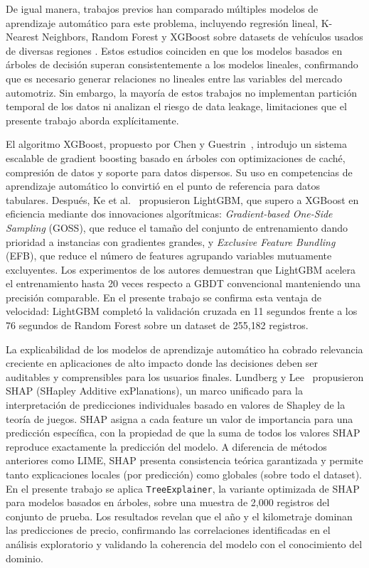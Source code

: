 \documentclass[conference]{IEEEtran}
\begin{document}
De igual manera, trabajos previos han comparado múltiples modelos de aprendizaje automático para este problema, incluyendo regresión lineal, K-Nearest Neighbors, Random Forest y XGBoost sobre datasets de vehículos usados de diversas regiones \cite{ijert2022}. Estos estudios coinciden en que los modelos basados en árboles de decisión  superan consistentemente a los modelos lineales, confirmando que es necesario generar relaciones no lineales entre las variables del mercado automotriz. Sin embargo, la mayoría de estos trabajos no implementan partición temporal de los datos ni analizan el riesgo de   data leakage, limitaciones que el presente trabajo aborda explícitamente.

El algoritmo XGBoost, propuesto por Chen y Guestrin~\cite{chen2016}, introdujo un sistema escalable de gradient boosting basado en árboles  con optimizaciones de caché, compresión de datos y soporte para datos dispersos. Su uso en competencias de aprendizaje automático lo convirtió en el punto de referencia para datos tabulares. Después, Ke et al.~\cite{ke2017} propusieron LightGBM, que supero a XGBoost en eficiencia mediante dos innovaciones algorítmicas: \textit{Gradient-based One-Side Sampling} (GOSS), que reduce el tamaño del conjunto de entrenamiento dando prioridad a instancias con gradientes grandes, y \textit{Exclusive Feature Bundling} (EFB), que reduce el número de features agrupando variables mutuamente excluyentes. Los experimentos de los autores demuestran que LightGBM acelera el entrenamiento hasta 20 veces respecto a GBDT convencional manteniendo una precisión comparable. En el presente trabajo se confirma esta ventaja de velocidad: LightGBM completó la validación cruzada en 11 segundos frente a los 76 segundos de Random Forest sobre un dataset de 255{,}182 registros.

La explicabilidad de los modelos de aprendizaje automático ha cobrado relevancia creciente en aplicaciones de alto impacto donde las decisiones deben ser auditables y comprensibles para los usuarios finales. Lundberg y Lee~\cite{lundberg2017} propusieron SHAP (SHapley Additive exPlanations), un marco unificado para la interpretación de predicciones individuales basado en valores de Shapley de la teoría de juegos. SHAP asigna a cada feature un valor de importancia para una predicción específica, con la propiedad de que la suma de todos los valores SHAP reproduce exactamente la predicción del modelo. A diferencia de métodos anteriores como LIME, SHAP presenta consistencia teórica garantizada y permite tanto explicaciones locales (por predicción) como globales (sobre todo el dataset). En el presente trabajo se aplica \texttt{TreeExplainer}, la variante optimizada de SHAP para modelos basados en árboles, sobre una muestra de 2{,}000 registros del conjunto de prueba. Los resultados revelan que el año y el kilometraje dominan las predicciones de precio, confirmando las correlaciones identificadas en el análisis exploratorio y validando la coherencia del modelo con el conocimiento del dominio.
\end{document}
